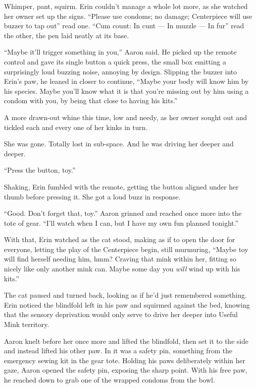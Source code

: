 Whimper, pant, squirm. Erin couldn't manage a whole lot more, as she watched her owner set up the signs. ``Please use condoms; no damage; Centerpiece will use buzzer to tap out'' read one. ``Cum count: In cunt --- In muzzle --- In fur'' read the other, the pen laid neatly at its base.

``Maybe it'll trigger something in you,'' Aaron said. He picked up the remote control and gave its single button a quick press, the small box emitting a surprisingly loud buzzing noise, annoying by design. Slipping the buzzer into Erin's paw, he leaned in closer to continue, ``Maybe your body will know him by his species. Maybe you'll know what it is that you're missing out by him using a condom with you, by being that close to having his kits.''

A more drawn-out whine this time, low and needy, as her owner sought out and tickled each and every one of her kinks in turn.

She was gone. Totally lost in sub-space. And he was driving her deeper and deeper.

``Press the button, toy.''

Shaking, Erin fumbled with the remote, getting the button aligned under her thumb before pressing it. She got a loud buzz in response.

``Good. Don't forget that, toy.'' Aaron grinned and reached once more into the tote of gear. ``I'll watch when I can, but I have my own fun planned tonight.''

With that, Erin watched as the cat stood, making as if to open the door for everyone, letting the play of the Centerpiece begin, still murmuring, ``Maybe toy will find herself needing him, hmm? Craving that mink within her, fitting so nicely like only another mink can. Maybe some day you \textit{will} wind up with his kits.''

The cat paused and turned back, looking as if he'd just remembered something. Erin noticed the blindfold left in his paw and squirmed against the bed, knowing that the sensory deprivation would only serve to drive her deeper into Useful Mink territory.

Aaron knelt before her once more and lifted the blindfold, then set it to the side and instead lifted his other paw. In it was a safety pin, something from the emergency sewing kit in the gear tote. Holding his paws deliberately within her gaze, Aaron opened the safety pin, exposing the sharp point. With his free paw, he reached down to grab one of the wrapped condoms from the bowl.

